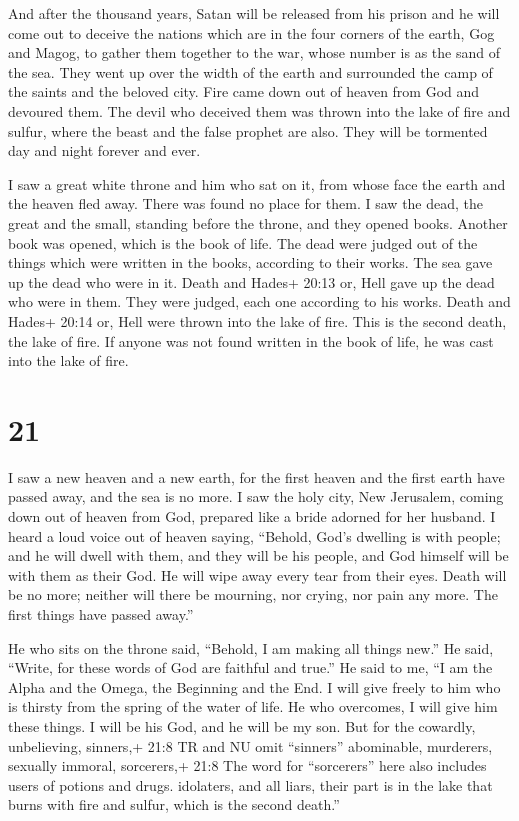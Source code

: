  And after the thousand years, Satan will be released from
his prison  and he will come out to deceive the nations
which are in the four corners of the earth, Gog and Magog, to gather
them together to the war, whose number is as the sand of the sea.
 They went up over the width of the earth and surrounded the
camp of the saints and the beloved city. Fire came down out of heaven
from God and devoured them.  The devil who deceived them
was thrown into the lake of fire and sulfur, where the beast and the
false prophet are also. They will be tormented day and night forever and
ever.

 I saw a great white throne and him who sat on it, from
whose face the earth and the heaven fled away. There was found no place
for them.  I saw the dead, the great and the small,
standing before the throne, and they opened books. Another book was
opened, which is the book of life. The dead were judged out of the
things which were written in the books, according to their works.
 The sea gave up the dead who were in it. Death and Hades+
20:13 or, Hell gave up the dead who were in them. They were judged, each
one according to his works.  Death and Hades+ 20:14 or,
Hell were thrown into the lake of fire. This is the second death, the
lake of fire.  If anyone was not found written in the book
of life, he was cast into the lake of fire.

\hypertarget{section-20}{%
\section{21}\label{section-20}}

 I saw a new heaven and a new earth, for the first heaven
and the first earth have passed away, and the sea is no more.
 I saw the holy city, New Jerusalem, coming down out of
heaven from God, prepared like a bride adorned for her husband.
 I heard a loud voice out of heaven saying, ``Behold, God's
dwelling is with people; and he will dwell with them, and they will be
his people, and God himself will be with them as their God. 
He will wipe away every tear from their eyes. Death will be no more;
neither will there be mourning, nor crying, nor pain any more. The first
things have passed away.''

 He who sits on the throne said, ``Behold, I am making all
things new.'' He said, ``Write, for these words of God are faithful and
true.''  He said to me, ``I am the Alpha and the Omega, the
Beginning and the End. I will give freely to him who is thirsty from the
spring of the water of life.  He who overcomes, I will give
him these things. I will be his God, and he will be my son. 
But for the cowardly, unbelieving, sinners,+ 21:8 TR and NU omit
``sinners'' abominable, murderers, sexually immoral, sorcerers,+ 21:8
The word for ``sorcerers'' here also includes users of potions and
drugs. idolaters, and all liars, their part is in the lake that burns
with fire and sulfur, which is the second death.''

